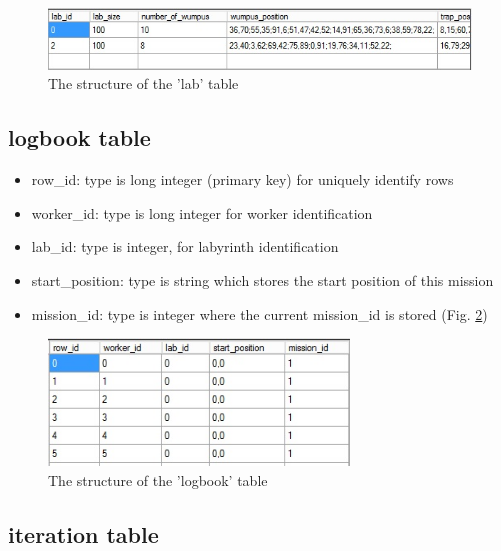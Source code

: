 \documentclass[a4paper,12pt]{article}
\begin{document}
\begin{figure}
	\begin{center}
		\includegraphics[width=14cm]{tablab.jpg}
		\caption{The structure of the 'lab' table}
		\label{fig:tablab}
	\end{center}
\end{figure}

\subsection{logbook table}

\begin{itemize}
	\item row\_id: type is long integer (primary key) for uniquely identify rows
	\item worker\_id: type is long integer for worker identification
	\item lab\_id: type is integer, for labyrinth identification
	\item start\_position: type is string which stores the start position of this mission
	\item mission\_id: type is integer where the current mission\_id is stored (Fig. \ref{fig:tablogbook})
\end{itemize}

\begin{figure}
	\begin{center}
		\includegraphics[width=8cm]{tablogbook.jpg}
		\caption{The structure of the 'logbook' table}
		\label{fig:tablogbook}
	\end{center}
\end{figure}

\subsection{iteration table}
\end{document}
